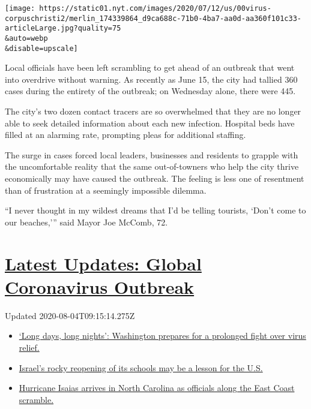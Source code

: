 \texttt{[image: https://static01.nyt.com/images/2020/07/12/us/00virus-corpuschristi2/merlin\_174339864\_d9ca688c-71b0-4ba7-aa0d-aa360f101c33-articleLarge.jpg?quality=75\\\&auto=webp\\\&disable=upscale]}

Local officials have been left scrambling to get ahead of an outbreak
that went into overdrive without warning. As recently as June 15, the
city had tallied 360 cases during the entirety of the outbreak; on
Wednesday alone, there were 445.

The city's two dozen contact tracers are so overwhelmed that they are no
longer able to seek detailed information about each new infection.
Hospital beds have filled at an alarming rate, prompting pleas for
additional staffing.

The surge in cases forced local leaders, businesses and residents to
grapple with the uncomfortable reality that the same out-of-towners who
help the city thrive economically may have caused the outbreak. The
feeling is less one of resentment than of frustration at a seemingly
impossible dilemma.

``I never thought in my wildest dreams that I'd be telling tourists,
`Don't come to our beaches,''' said Mayor Joe McComb, 72.

\hypertarget{latest-updates-global-coronavirus-outbreak}{%
\section{\texorpdfstring{\href{https://www.nytimes.com/2020/08/04/world/coronavirus-covid-19.html?action=click\&pgtype=Article\&state=default\&region=MAIN_CONTENT_1\&context=storylines_live_updates}{Latest
Updates: Global Coronavirus
Outbreak}}{Latest Updates: Global Coronavirus Outbreak}}\label{latest-updates-global-coronavirus-outbreak}}

Updated 2020-08-04T09:15:14.275Z

\begin{itemize}
\tightlist
\item
  \href{https://www.nytimes.com/2020/08/04/world/coronavirus-covid-19.html?action=click\&pgtype=Article\&state=default\&region=MAIN_CONTENT_1\&context=storylines_live_updates\#link-6b644638}{`Long
  days, long nights': Washington prepares for a prolonged fight over
  virus relief.}
\item
  \href{https://www.nytimes.com/2020/08/04/world/coronavirus-covid-19.html?action=click\&pgtype=Article\&state=default\&region=MAIN_CONTENT_1\&context=storylines_live_updates\#link-7af9fca0}{Israel's
  rocky reopening of its schools may be a lesson for the U.S.}
\item
  \href{https://www.nytimes.com/2020/08/04/world/coronavirus-covid-19.html?action=click\&pgtype=Article\&state=default\&region=MAIN_CONTENT_1\&context=storylines_live_updates\#link-33bf9168}{Hurricane
  Isaias arrives in North Carolina as officials along the East Coast
  scramble.}
\end{itemize}

